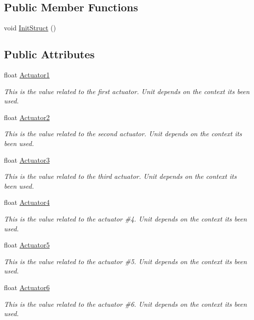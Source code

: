 \subsection*{Public Member Functions}
\begin{DoxyCompactItemize}
\item 
void \hyperlink{structAngularInfo_a092156b3e0e6cb657ed4bb2f6b15a9f0}{Init\+Struct} ()
\end{DoxyCompactItemize}
\subsection*{Public Attributes}
\begin{DoxyCompactItemize}
\item 
float \hyperlink{structAngularInfo_a5fc555c085bddc82c33a3039fbc40932}{Actuator1}
\begin{DoxyCompactList}\small\item\em This is the value related to the first actuator. Unit depends on the context it\textquotesingle{}s been used. \end{DoxyCompactList}\item 
float \hyperlink{structAngularInfo_ab7b9349eef239f9741d9c28a795e4c35}{Actuator2}
\begin{DoxyCompactList}\small\item\em This is the value related to the second actuator. Unit depends on the context it\textquotesingle{}s been used. \end{DoxyCompactList}\item 
float \hyperlink{structAngularInfo_a30426eab94c82cfd3d697bbc8c506c2a}{Actuator3}
\begin{DoxyCompactList}\small\item\em This is the value related to the third actuator. Unit depends on the context it\textquotesingle{}s been used. \end{DoxyCompactList}\item 
float \hyperlink{structAngularInfo_a46a1314c4846de6a495310b44fe5e0c3}{Actuator4}
\begin{DoxyCompactList}\small\item\em This is the value related to the actuator \#4. Unit depends on the context it\textquotesingle{}s been used. \end{DoxyCompactList}\item 
float \hyperlink{structAngularInfo_a953c29d2481eb1c42c84e9c992d34dde}{Actuator5}
\begin{DoxyCompactList}\small\item\em This is the value related to the actuator \#5. Unit depends on the context it\textquotesingle{}s been used. \end{DoxyCompactList}\item 
float \hyperlink{structAngularInfo_ab54771129d8a9e451c27942dd349340d}{Actuator6}
\begin{DoxyCompactList}\small\item\em This is the value related to the actuator \#6. Unit depends on the context it\textquotesingle{}s been used. \end{DoxyCompactList}\end{DoxyCompactItemize}


